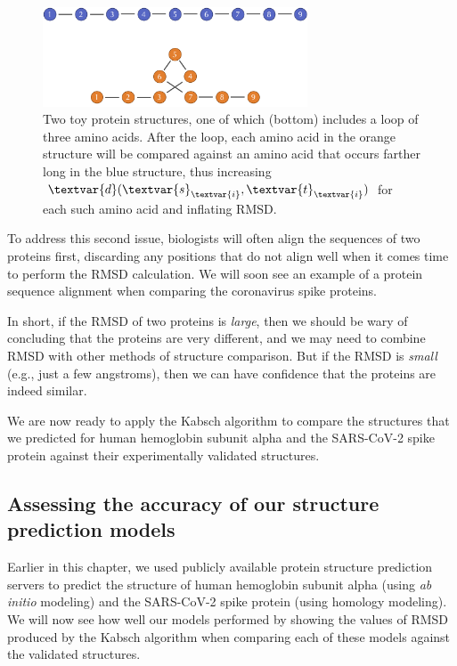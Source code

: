 \begin{figure}[t]
	\centering
	\mySfFamily
	\includegraphics[width = 0.7\textwidth]{../images/RMSD_weakness_loop.png}
	\caption{Two toy protein structures, one of which (bottom) includes a loop of three amino acids. After the loop, each amino acid in the orange structure will be compared against an amino acid that occurs farther long in the blue structure, thus increasing $\textvar{d}(\textvar{s}_{\textvar{i}}, \textvar{t}_{\textvar{i}})$ for each such amino acid and inflating RMSD.}
	\label{fig:RMSD_weakness_loop}
\end{figure}

To address this second issue, biologists will often align the sequences of two proteins first, discarding any positions that do not align well when it comes time to perform the RMSD calculation. We will soon see an example of a protein sequence alignment when comparing the coronavirus spike proteins.

In short, if the RMSD of two proteins is \textit{large}, then we should be wary of concluding that the proteins are very different, and we may need to combine RMSD with other methods of structure comparison. But if the RMSD is \textit{small} (e.g., just a few angstroms), then we can have confidence that the proteins are indeed similar.

We are now ready to apply the Kabsch algorithm to compare the structures that we predicted for human hemoglobin subunit alpha and the SARS-CoV-2 spike protein against their experimentally validated structures. 

\FloatBarrier
{}
\subsection{Assessing the accuracy of our structure prediction models}

Earlier in this chapter, we used publicly available protein structure prediction servers to predict the structure of human hemoglobin subunit alpha (using \textit{ab initio} modeling) and the SARS-CoV-2 spike protein (using homology modeling). We will now see how well our models performed by showing the values of RMSD produced by the Kabsch algorithm when comparing each of these models against the validated structures.

